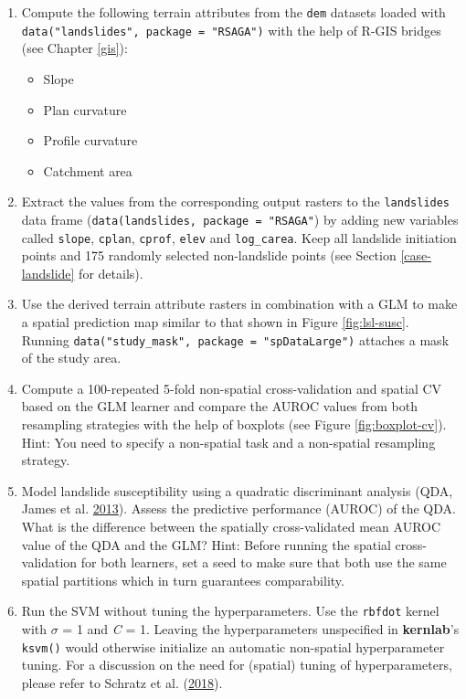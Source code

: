 \documentclass[]{krantz}
\providecommand{\tightlist}{%
  \setlength{\itemsep}{0pt}\setlength{\parskip}{0pt}}
\begin{document}
\begin{enumerate}
\def\labelenumi{\arabic{enumi}.}
\tightlist
\item
  Compute the following terrain attributes from the \texttt{dem} datasets loaded with \texttt{data("landslides",\ package\ =\ "RSAGA")} with the help of R-GIS bridges (see Chapter \ref{gis}):

  \begin{itemize}
  \tightlist
  \item
    Slope
  \item
    Plan curvature
  \item
    Profile curvature
  \item
    Catchment area
  \end{itemize}
\item
  Extract the values from the corresponding output rasters to the \texttt{landslides} data frame (\texttt{data(landslides,\ package\ =\ "RSAGA"}) by adding new variables called \texttt{slope}, \texttt{cplan}, \texttt{cprof}, \texttt{elev} and \texttt{log\_carea}. Keep all landslide initiation points and 175 randomly selected non-landslide points (see Section \ref{case-landslide} for details).
\item
  Use the derived terrain attribute rasters in combination with a GLM to make a spatial prediction map similar to that shown in Figure \ref{fig:lsl-susc}.
  Running \texttt{data("study\_mask",\ package\ =\ "spDataLarge")} attaches a mask of the study area.
\item
  Compute a 100-repeated 5-fold non-spatial cross-validation and spatial CV based on the GLM learner and compare the AUROC values from both resampling strategies with the help of boxplots (see Figure \ref{fig:boxplot-cv}).
  Hint: You need to specify a non-spatial task and a non-spatial resampling strategy.
\item
  Model landslide susceptibility using a quadratic discriminant analysis (QDA, James et al. \protect\hyperlink{ref-james_introduction_2013}{2013}).
  Assess the predictive performance (AUROC) of the QDA.
  What is the difference between the spatially cross-validated mean AUROC value of the QDA and the GLM?
  Hint: Before running the spatial cross-validation for both learners, set a seed to make sure that both use the same spatial partitions which in turn guarantees comparability.
\item
  Run the SVM without tuning the hyperparameters.
  Use the \texttt{rbfdot} kernel with \(\sigma\) = 1 and \emph{C} = 1.
  Leaving the hyperparameters unspecified in \textbf{kernlab}'s \texttt{ksvm()} would otherwise initialize an automatic non-spatial hyperparameter tuning.
  For a discussion on the need for (spatial) tuning of hyperparameters, please refer to Schratz et al. (\protect\hyperlink{ref-schratz_performance_nodate}{2018}).
\end{enumerate}
\end{document}
